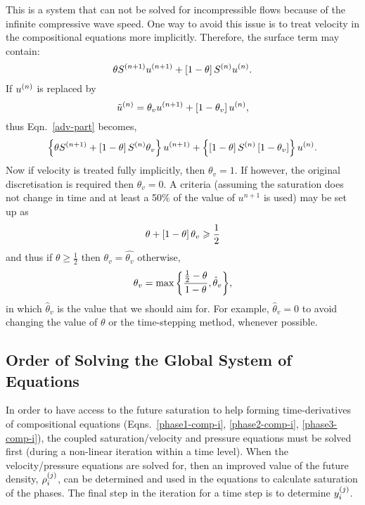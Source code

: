 This is a system that can not be solved for incompressible flows because of the infinite compressive wave speed. One way to avoid this issue is to treat velocity in the compositional equations more implicitly. Therefore, the surface term may contain:
\begin{equation}
    \theta\mfr[S]{}{n+1}\mfr[u]{}{n+1} + \left[1-\theta\right]\mfr[S]{}{n}\mfr[u]{}{n}. \label{adv-part} 
\end{equation}
If $\mfr[u]{}{n}$ is replaced by
\begin{displaymath}
    \mfr[\tilde{u}]{}{n} = \theta_{v}\mfr[u]{}{n+1} + \left[1-\theta_{v}\right]\mfr[u]{}{n},
\end{displaymath}
thus Eqn.~\ref{adv-part} becomes,
\begin{equation}
    \left\{\theta\mfr[S]{}{n+1} + \left[1-\theta\right]\mfr[S]{}{n}\theta_{v}\right\}\mfr[u]{}{n+1} + \left\{\left[1-\theta\right]\mfr[S]{}{n} \left[1-\theta_{v}\right]\right\}\mfr[u]{}{n}. 
\label{adv-part-implicit-vel}
\end{equation}
Now if velocity is treated fully implicitly, then $\theta_{v}=1$. If however, the original discretisation is required then $\theta_{v}=0$. A criteria (assuming the saturation does not change in time and at least a 50$\%$ of the value of $u^{n+1}$ is used) may be set up as 
\begin{displaymath}
  \theta+\left[1-\theta\right]\theta_{v} \ge \frc{1}{2} 
\end{displaymath}
and thus if $\theta\ge\frac{1}{2}$ then $\theta_{v} = \hat{\theta_{v}}$ otherwise,  
\begin{displaymath}
\theta_{v} =\max{ \left\{ \frc{\frac{1}{2}-\theta}{1-\theta}, \hat{\theta}_{v} \right\}} , 
\end{displaymath}
in which $\hat\theta_{v}$ is the value that we should aim for. For example, $\hat{\theta}_v=0$ to avoid changing the value of $\theta$ or the time-stepping method, whenever possible. 


\subsection{Order of Solving the Global System of Equations} \label{Chapter:CompositionalModel:Section:OrderofSolving}
In order to have access to the future saturation to help forming time-derivatives of compositional equations (Eqns.~\ref{phase1-comp-i}, \ref{phase2-comp-i}, \ref{phase3-comp-i}), the coupled saturation/velocity and pressure equations must be solved first (during a non-linear iteration within a time level). When the velocity/pressure equations are solved for, then an improved value of the future density, $\mfr[\rho]{i}{j}$, can be determined and used in the equations to calculate saturation of the phases. The final step in the iteration for a time step is to determine $\mfr[y]{i}{j}$. 

